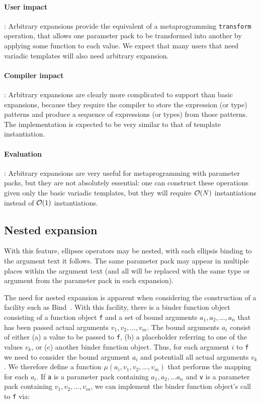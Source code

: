 \documentclass{article}
\begin{document}
\paragraph{User impact}: Arbitrary expansions provide the equivalent
of a metaprogramming \texttt{transform} operation, that allows one
parameter pack to be transformed into another by applying some
function to each value. We expect that many users that need variadic
templates will also need arbitrary expansion.

\paragraph{Compiler impact}: Arbitrary expansions are clearly more
complicated to support than basic expansions, because they require the
compiler to store the expression (or type) patterns and produce a
sequence of expressions (or types) from those patterns. The
implementation is expected to be very similar to that of template
instantiation.

\paragraph{Evaluation}: Arbitrary expansions are very useful for
metaprogramming with parameter packs, but they are not absolutely
essential: one can construct these operations given only the basic
variadic templates, but they will require ${\cal O}(N)$ instantiations
instead of ${\cal O}(1)$ instantiations.

\subsection{Nested expansion}
With this feature, ellipses operators may be nested, with each
ellipsis binding to the argument text it follows. The same parameter
pack may appear in multiple places within the argument text (and all
will be replaced with the same type or argument from the parameter
pack in each expansion). 

The need for nested expansion is apparent when considering the
construction of a facility such as Bind~\cite[\S
  3.3]{Austern04b}. With this facility, there is a binder function
object consisting of a function object \texttt{f} and a set of bound
arguments $a_1, a_2, \ldots, a_n$ that has been passed actual
arguments $v_1, v_2, \ldots, v_m$. The bound arguments $a_i$ consist
of either (a) a value to be passed to \texttt{f}, (b) a placeholder
referring to one of the values $v_k$, or (c) another binder function
object. Thus, for each argument $i$ to \texttt{f} we need to consider
the bound argument $a_i$ and potentiall all actual arguments $v_k$. We
therefore define a function $\mu(a_i, v_1, v_2, \ldots, v_m)$ that
performs the mapping for each $a_i$. If \texttt{a} is a parameter pack
containing $a_1, a_2, \ldots a_n$ and \texttt{v} is a parameter pack
containing $v_1, v_2, \ldots, v_m$, we can implement the binder
function object's call to \texttt{f} via:
\end{document}
